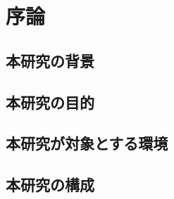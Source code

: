 \chapter{序論}
\label{chap:introduction}

\section{本研究の背景}

\section{本研究の目的}

\section{本研究が対象とする環境}

\section{本研究の構成}

